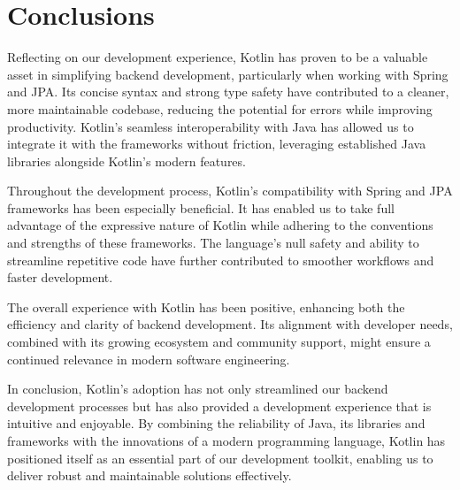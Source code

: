 \section{Conclusions}
\label{sec:conclusion}

Reflecting on our development experience, Kotlin has proven to be a valuable asset in simplifying backend development, particularly when working with Spring and JPA. Its concise syntax and strong type safety have contributed to a cleaner, more maintainable codebase, reducing the potential for errors while improving productivity.
Kotlin’s seamless interoperability with Java has allowed us to integrate it with the frameworks without friction, leveraging established Java libraries alongside Kotlin's modern features.

Throughout the development process, Kotlin’s compatibility with Spring and JPA frameworks has been especially beneficial.
It has enabled us to take full advantage of the expressive nature of Kotlin while adhering to the conventions and strengths of these frameworks.
The language’s null safety and ability to streamline repetitive code have further contributed to smoother workflows and faster development.

The overall experience with Kotlin has been positive, enhancing both the efficiency and clarity of backend development.
Its alignment with developer needs, combined with its growing ecosystem and community support, might ensure a continued relevance in modern software engineering.

In conclusion, Kotlin’s adoption has not only streamlined our backend development processes but has also provided a development experience that is intuitive and enjoyable.
By combining the reliability of Java, its libraries and frameworks with the innovations of a modern programming language, Kotlin has positioned itself as an essential part of our development toolkit, enabling us to deliver robust and maintainable solutions effectively.
